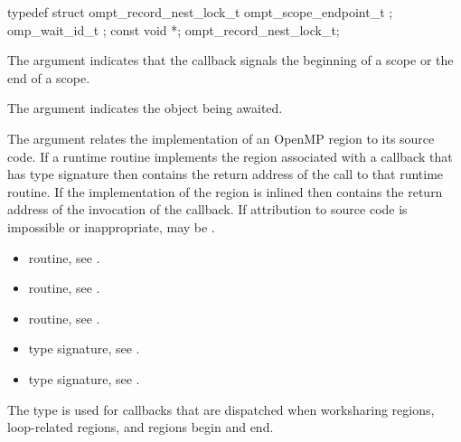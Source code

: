 \record
\begin{ccppspecific}
\begin{omptRecord}
typedef struct ompt_record_nest_lock_t {
  ompt_scope_endpoint_t ;
  omp_wait_id_t ;
  const void *;
} ompt_record_nest_lock_t;
\end{omptRecord}
\end{ccppspecific}

\argdesc
The  argument indicates that the callback signals
the beginning of a scope or the end of a scope.

The  argument indicates the object being awaited.

The  argument relates the implementation of an OpenMP region
to its source code. If a runtime routine implements the region associated with
a callback that has type signature  then
 contains the return address of the call to that runtime routine.
If the implementation of the region is inlined then  contains the
return address of the invocation of the callback. If attribution to source code
is impossible or inappropriate, may be .

\crossreferences
\begin{itemize}
\item {} routine, 
see .

\item {} routine, 
see .

\item {} routine, 
see .

\item {} type signature, see 
.

\item {} type signature, see .
\end{itemize}



\label{sec:ompt_callback_work_t}
\summary
The  type is used for callbacks that
are dispatched when worksharing regions, loop-related regions, 
and  regions begin and end.

